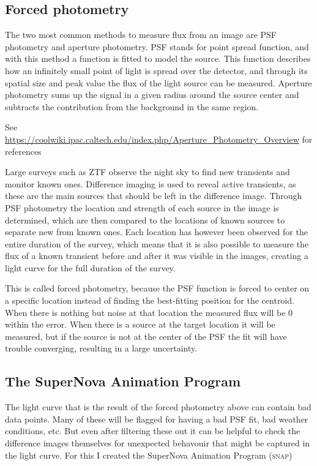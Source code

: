 \documentclass[a4paper,oneside,12pt, class=Latex/Classes/PhDthesisPSnPDF, crop=false]{standalone}
\begin{document}
\subsection{Forced photometry}
The two most common methods to measure flux from an image are PSF photometry and aperture photometry. PSF stands for point spread function, and with this method a function is fitted to model the source. This function describes how an infinitely small point of light is spread over the detector, and through its spatial size and peak value the flux of the light source can be measured. Aperture photometry sums up the signal in a given radius around the source center and subtracts the contribution from the background in the same region.

\color{red} See \url{https://coolwiki.ipac.caltech.edu/index.php/Aperture_Photometry_Overview} for references \color{black}

Large surveys such as ZTF observe the night sky to find new transients and monitor known ones. Difference imaging is used to reveal active transients, as these are the main sources that should be left in the difference image. Through PSF photometry the location and strength of each source in the image is determined, which are then compared to the locations of known sources to separate new from known ones. Each location has however been observed for the entire duration of the survey, which means that it is also possible to measure the flux of a known transient before and after it was visible in the images, creating a light curve for the full duration of the survey.

This is called forced photometry, because the PSF function is forced to center on a specific location instead of finding the best-fitting position for the centroid. When there is nothing but noise at that location the measured flux will be 0 within the error. When there is a source at the target location it will be measured, but if the source is not at the center of the PSF the fit will have trouble converging, resulting in a large uncertainty.

\subsection{The SuperNova Animation Program}
The light curve that is the result of the forced photometry above can contain bad data points. Many of these will be flagged for having a bad PSF fit, bad weather conditions, etc. But even after filtering these out it can be helpful to check the difference images themselves for unexpected behavouir that might be captured in the light curve. For this I created the SuperNova Animation Program (\textsc{snap})
\end{document}
